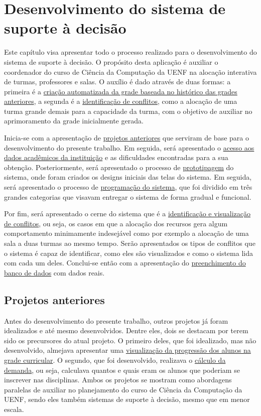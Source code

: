 \chapter{Desenvolvimento do sistema de suporte à decisão} \label{chap:desenvolvimento} %

Este capítulo visa apresentar todo o processo realizado para o desenvolvimento do sistema de suporte à decisão. O propósito desta aplicação é auxiliar o coordenador do curso de Ciência da Computação da UENF na alocação interativa de turmas, professores e salas. O auxílio é dado através de duas formas: a primeira é a \hyperref[par:Solução inicial]{criação automatizada da grade baseada no histórico das grades anteriores}, a segunda é a \hyperref[sec:conflitos]{identificação de conflitos}, como a alocação de uma turma grande demais para a capacidade da turma, com o objetivo de auxiliar no aprimoramento da grade inicialmente gerada.

Inicia-se com a apresentação de \hyperref[sec:projetos]{projetos anteriores} que serviram de base para o desenvolvimento do presente trabalho. Em seguida, será apresentado o \hyperref[sec:LGPD]{acesso aos dados acadêmicos da instituição} e as dificuldades encontradas para a sua obtenção. Posteriormente, será apresentado o processo de \hyperref[sec:prototipagem]{prototipagem} do sistema, onde foram criados os designs iniciais das telas do sistema. Em seguida, será apresentado o processo de \hyperref[sec:programação]{programação do sistema}, que foi dividido em três grandes categorias que visavam entregar o sistema de forma gradual e funcional.

Por fim, será apresentado o cerne do sistema que é a \hyperref[sec:conflitos]{identificação e visualização de conflitos}, ou seja, os casos em que a alocação dos recursos gera algum comportamento minimamente indesejável como por exemplo a alocação de uma sala a duas turmas ao mesmo tempo. Serão apresentados os tipos de conflitos que o sistema é capaz de identificar, como eles são visualizados e como o sistema lida com cada um deles. Conclui-se então com a apresentação do \hyperref[sec:preenchimento]{preenchimento do banco de dados} com dados reais.

\section{Projetos anteriores} \label{sec:projetos} %

Antes do desenvolvimento do presente trabalho, outros projetos já foram idealizados e até mesmo desenvolvidos. Dentre eles, dois se destacam por terem sido os precursores do atual projeto. O primeiro deles, que foi idealizado, mas não desenvolvido, almejava apresentar uma \hyperref[ssec:andamento]{visualização da progressão dos alunos na grade curricular}. O segundo, que foi desenvolvido, realizava o \hyperref[ssec:demanda]{cálculo da demanda}, ou seja, calculava quantos e quais eram os alunos que poderiam se inscrever nas disciplinas. Ambos os projetos se mostram como abordagens paralelas de auxiliar no planejamento do curso de Ciência da Computação da UENF, sendo eles também sistemas de suporte à decisão, mesmo que em menor escala.

